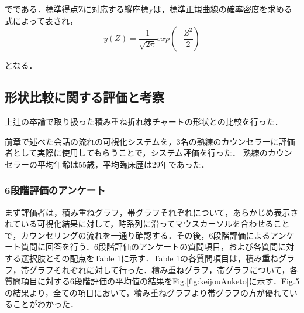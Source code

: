 \documentclass[shuuron]{kuee}
\begin{document}
でである．標準得点Zに対応する縦座標yは，標準正規曲線の確率密度を求める式によって表され，
\begin{equation}
  y(Z)=\frac{1}{\sqrt{2\pi}}exp(-\frac{Z^2}{2})
\end{equation}

となる．






\subsection{形状比較に関する評価と考察}
上辻\cite{uetsuji}の卒論で取り扱った積み重ね折れ線チャートの形状との比較を行った．

前章で述べた会話の流れの可視化システムを，3名の熟練のカウンセラーに評価者として実際に使用してもらうことで，システム評価を行った．
熟練のカウンセラーの平均年齢は55歳，平均臨床歴は29年であった．

\subsubsection{6段階評価のアンケート}



まず評価者は，積み重ねグラフ，帯グラフそれぞれについて，あらかじめ表示されている可視化結果に対して，時系列に沿ってマウスカーソルを合わせることで，カウンセリングの流れを一通り確認する．その後，6段階評価によるアンケート質問に回答を行う．6段階評価のアンケートの質問項目，および各質問に対する選択肢とその配点をTable 1に示す．Table 1の各質問項目は，積み重ねグラフ，帯グラフそれぞれに対して行った．積み重ねグラフ，帯グラフについて，各質問項目に対する6段階評価の平均値の結果をFig.\ref{fig:keijouAnketo}に示す．Fig.5 の結果より，全ての項目において，積み重ねグラフより帯グラフの方が優れていることがわかった．

%
\end{document}
